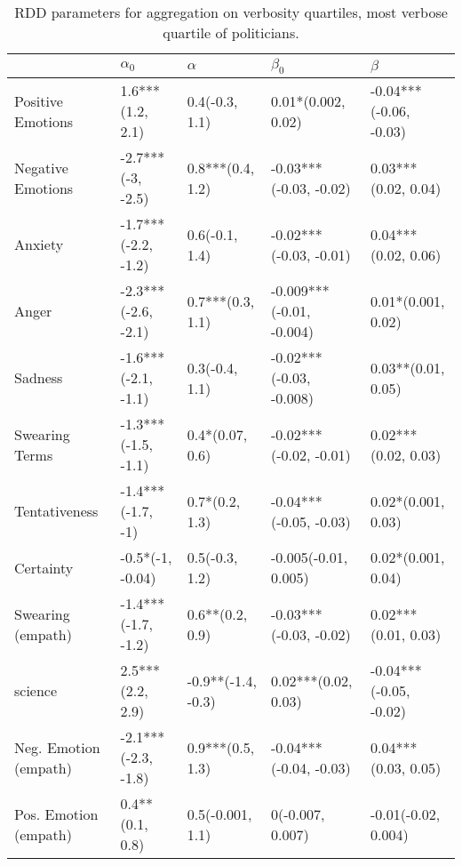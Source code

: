 \begin{table}[h]\centering
\caption{RDD parameters for aggregation on verbosity quartiles, most verbose quartile of politicians.}
	\label{fig: Verbosity_1}
\begin{adjustbox}{width=\linewidth, center}
	\begin{tabular}{lllll}
	\toprule
	{} &           $\alpha_0$ &            $\alpha$ &                 $\beta_0$ &                 $\beta$ \\
	\midrule
	Positive Emotions     &     1.6***(1.2, 2.1) &      0.4(-0.3, 1.1) &        0.01*(0.002, 0.02) &  -0.04***(-0.06, -0.03) \\
	Negative Emotions     &    -2.7***(-3, -2.5) &    0.8***(0.4, 1.2) &    -0.03***(-0.03, -0.02) &     0.03***(0.02, 0.04) \\
	Anxiety               &  -1.7***(-2.2, -1.2) &      0.6(-0.1, 1.4) &    -0.02***(-0.03, -0.01) &     0.04***(0.02, 0.06) \\
	Anger                 &  -2.3***(-2.6, -2.1) &    0.7***(0.3, 1.1) &  -0.009***(-0.01, -0.004) &      0.01*(0.001, 0.02) \\
	Sadness               &  -1.6***(-2.1, -1.1) &      0.3(-0.4, 1.1) &   -0.02***(-0.03, -0.008) &      0.03**(0.01, 0.05) \\
	Swearing Terms        &  -1.3***(-1.5, -1.1) &     0.4*(0.07, 0.6) &    -0.02***(-0.02, -0.01) &     0.02***(0.02, 0.03) \\
	Tentativeness         &    -1.4***(-1.7, -1) &      0.7*(0.2, 1.3) &    -0.04***(-0.05, -0.03) &      0.02*(0.001, 0.03) \\
	Certainty             &     -0.5*(-1, -0.04) &      0.5(-0.3, 1.2) &      -0.005(-0.01, 0.005) &      0.02*(0.001, 0.04) \\
	Swearing (empath)     &  -1.4***(-1.7, -1.2) &     0.6**(0.2, 0.9) &    -0.03***(-0.03, -0.02) &     0.02***(0.01, 0.03) \\
	science               &     2.5***(2.2, 2.9) &  -0.9**(-1.4, -0.3) &       0.02***(0.02, 0.03) &  -0.04***(-0.05, -0.02) \\
	Neg. Emotion (empath) &  -2.1***(-2.3, -1.8) &    0.9***(0.5, 1.3) &    -0.04***(-0.04, -0.03) &     0.04***(0.03, 0.05) \\
	Pos. Emotion (empath) &      0.4**(0.1, 0.8) &    0.5(-0.001, 1.1) &          0(-0.007, 0.007) &     -0.01(-0.02, 0.004) \\
	\bottomrule
	\end{tabular}
	
\end{adjustbox}
	\end{table}


